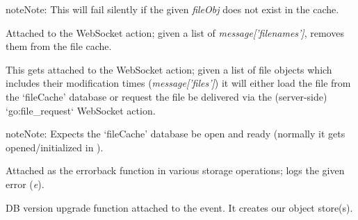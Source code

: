\documentclass[letterpaper,10pt,openany]{sphinxmanual}
\begin{document}
\begin{fulllineitems}
\begin{fulllineitems}
\begin{fulllineitems}
\begin{notice}{note}{Note:}
This will fail silently if the given \emph{fileObj} does not exist in the cache.
\end{notice}

\end{fulllineitems}



\begin{fulllineitems}
\label{Developer/js_gateone:GateOne.Storage.cacheExpiredAction}
Attached to the  WebSocket action; given a list of \emph{message{[}'filenames'{]}}, removes them from the file cache.

\end{fulllineitems}



\begin{fulllineitems}
\label{Developer/js_gateone:GateOne.Storage.fileCheckAction}
This gets attached to the  WebSocket action; given a list of file objects which includes their modification times (\emph{message{[}'files'{]}}) it will either load the file from the `fileCache' database or request the file be delivered via the (server-side) `go:file\_request` WebSocket action.

\begin{notice}{note}{Note:}
Expects the `fileCache' database be open and ready (normally it gets opened/initialized in {\hyperref[Developer/js_gateone:GateOne.initialize]{}}).
\end{notice}

\end{fulllineitems}



\begin{fulllineitems}
\label{Developer/js_gateone:GateOne.Storage.onerror}
Attached as the errorback function in various storage operations; logs the given error (\emph{e}).

\end{fulllineitems}



\begin{fulllineitems}
\label{Developer/js_gateone:GateOne.Storage._upgradeDB}
DB version upgrade function attached to the  event.  It creates our object store(s).


\end{fulllineitems}
\end{fulllineitems}
\end{fulllineitems}
\end{document}
